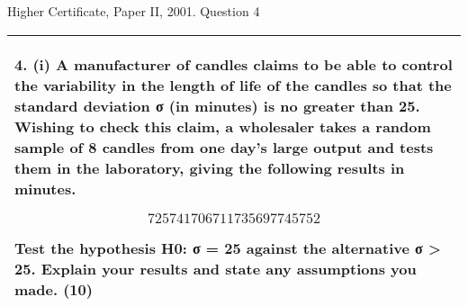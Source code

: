 \documentclass[a4paper,12pt]{article}
\begin{document}

Higher Certificate, Paper II, 2001. Question 4

\begin{table}[ht!]
 
\centering
 
\begin{tabular}{|p{15cm}|}
 
\hline  

4. (i) A manufacturer of candles claims to be able to control the variability in the length of life of the candles so that the standard deviation σ  (in minutes) is no greater than 25.  Wishing to check this claim, a wholesaler takes a random sample of 8 candles from one day's large output and tests them in the laboratory, giving the following results in minutes. 
 
  \[ 725   741   706   711   735   697   745   752 \]
 
Test the hypothesis H0: 
σ = 25 against the alternative σ > 25.  Explain your results and state any assumptions you made. (10) 


\\ \hline
  
\end{tabular}

\end{table}
\end{document}

